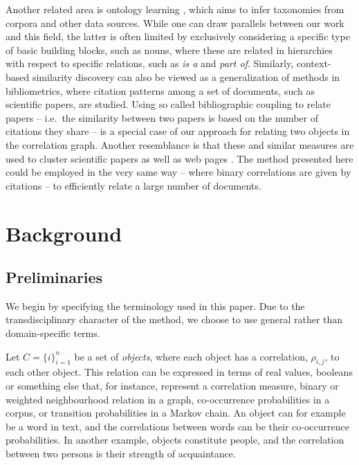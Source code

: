 \documentclass{kais}
\newcommand{\rn}[1]{\rho_{#1}}
\begin{document}
Another related area is ontology learning \cite{Wong2012ontology}, which aims to infer taxonomies 
from corpora and other data sources. While one can draw parallels between our work and this field, the latter is often limited 
by exclusively considering a specific type of basic building blocks, such as nouns, where these are related in 
 hierarchies with respect to specific relations, such as \emph{is a} and \emph{part of}. Similarly, context-based similarity
  discovery can also be viewed as a generalization of methods in bibliometrics, where citation patterns among a set of 
  documents, such as scientific papers, are studied. Using so called bibliographic coupling to relate papers  \cite{Kessler1963} 
  -- i.e.\ the similarity between two papers is based on the number of  citations they share -- is a special case of our approach 
  for relating two objects in the correlation graph. Another resemblance is that  these and similar measures are used to cluster 
  scientific papers \cite{Small1973} as well as web pages \cite{Larson96}. The method presented here could be employed in 
  the very same way -- where binary correlations are given by citations -- to efficiently relate a large number of documents.

\section{Background}
\label{sec:background}

\subsection{Preliminaries}
\label{sec:preliminaries}

We begin by specifying the terminology used in this paper. Due to the transdisciplinary character of the method, we
 choose to use general rather than domain-specific terms.

Let $C = \{i\}_{i=1}^n$ be a set of \emph{objects}, where each object has a correlation, $\rn{i,j}$, to
each other object. This relation can be expressed in terms of real values, booleans or something
else that, for instance, represent a correlation measure, binary or weighted neighbourhood relation in a graph,
co-occurrence probabilities in a corpus, or transition probabilities in a Markov chain. An object can for example be a 
word in text, and the correlations between words can be their co-occurrence probabilities. In another example, objects 
constitute people, and the correlation between two persons is their strength of acquaintance.
\end{document}
